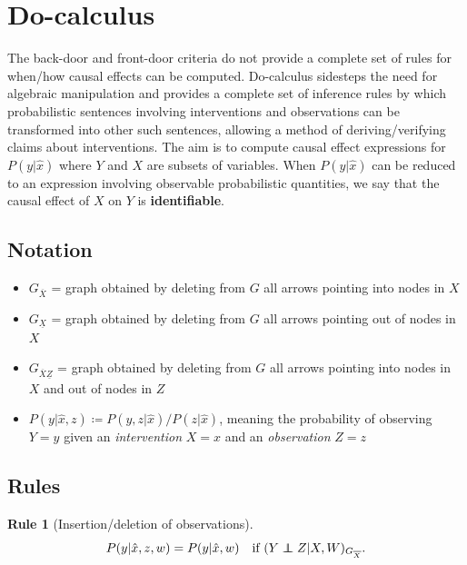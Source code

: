 \documentclass[11pt]{article}
\numberwithin{equation}{section}
\newcommand\indep{\protect\mathpalette{\protect\independenT}{\perp}}
\def\independenT#1#2{\mathrel{\rlap{$#1#2$}\mkern2mu{#1#2}}}
\newcommand{\defeq}{\coloneqq}
\newtheorem{rle}{Rule}[section]
\begin{document}
\section{Do-calculus} \label{sec:do-calc}

The back-door and front-door criteria do not provide a complete set of rules for when/how causal effects can be computed. Do-calculus sidesteps the need for algebraic manipulation and provides a complete set of inference rules by which probabilistic sentences involving interventions and observations can be transformed into other such sentences, allowing a method of deriving/verifying claims about interventions. The aim is to compute causal effect expressions for $P(y|\hat{x})$ where $Y$ and $X$ are subsets of variables. When $P(y|\hat{x})$ can be reduced to an expression involving observable probabilistic quantities, we say that the causal effect of $X$ on $Y$ is \textbf{identifiable}.

\subsection{Notation}
\begin{itemize}[noitemsep]
\item $G_{\overline{X}}$ = graph obtained by deleting from $G$ all arrows pointing into nodes in $X$
\item $G_{\underline{X}}$ = graph obtained by deleting from $G$ all arrows pointing out of nodes in $X$
\item $G_{\overline{X}\underline{Z}}$ = graph obtained by deleting from $G$ all arrows pointing into nodes in $X$ and out of nodes in $Z$
\item $P(y|\hat{x},z) \defeq P(y,z|\hat{x}) / P(z|\hat{x})$, meaning the probability of observing $Y=y$ given an \textit{intervention} $X=x$ and an \textit{observation} $Z=z$
\end{itemize}

\subsection{Rules} \label{sec:Rules}

\begin{rle}[Insertion/deletion of observations] 
\begin{equation}
P(y|\hat{x}, z, w) = P(y| \hat{x}, w) \quad \text{if}\ (Y \indep Z|X,W)_{G_{{\overline{X}}}}.
\end{equation} \label{rle:do-calc-ins-del-obs}
\end{rle}
\end{document}
